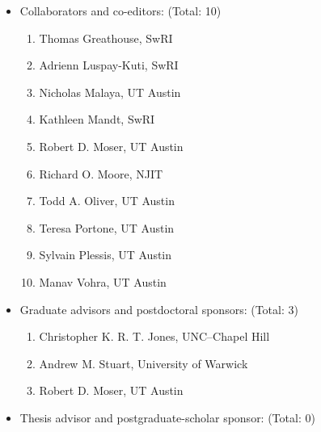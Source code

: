 \documentclass[11pt]{article}
\begin{document}
\begin{itemize}
  \item Collaborators and co-editors: (Total: 10)
    \begin{enumerate}
      \item Thomas Greathouse, SwRI
      \item Adrienn Luspay-Kuti, SwRI
      \item Nicholas Malaya, UT Austin
      \item Kathleen Mandt, SwRI
      \item Robert D. Moser, UT Austin
      \item Richard O. Moore, NJIT
      \item Todd A. Oliver, UT Austin
      \item Teresa Portone, UT Austin
      \item Sylvain Plessis, UT Austin
      \item Manav Vohra, UT Austin
    \end{enumerate}
  \item Graduate advisors and postdoctoral sponsors: (Total: 3)
    \begin{enumerate}
      \item Christopher K. R. T. Jones, UNC--Chapel Hill
      \item Andrew M. Stuart, University of Warwick
      \item Robert D. Moser, UT Austin
    \end{enumerate}
  \item Thesis advisor and postgraduate-scholar sponsor: (Total: 0)
\end{itemize}
\end{document}
